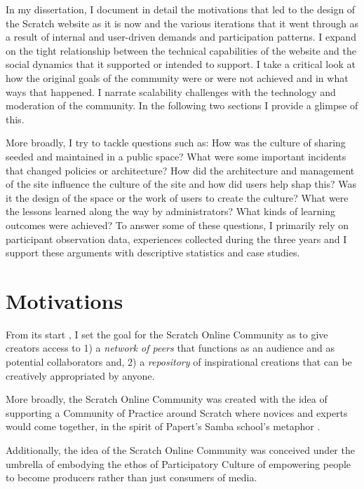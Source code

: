 In my dissertation, I  document in detail the motivations that led to the design of the Scratch website as it is now and the various iterations that it went through as a result of internal and user-driven demands and participation patterns.
I expand on the tight relationship between the technical capabilities of the website and the social dynamics that it supported or intended to support.
I take a critical look at how the original goals of the community were or were not achieved and in what ways that happened. 
I narrate scalability challenges with the technology and moderation of the community.
In the following two sections I provide a glimpse of this.

More broadly, I try to tackle questions such as: How was the culture of sharing seeded and maintained in a public space? What were some important incidents that changed policies or architecture? How did the architecture and management of the site influence the culture of the site and how did users help shap this? 
Was it the design of the space or the work of users to create the culture?
 What were the lessons learned along the way by administrators? What kinds of learning outcomes were achieved?
To answer some of these questions, I primarily rely on participant observation data, experiences collected during the three years and I support these arguments with descriptive statistics and case studies.


\section{Motivations}

From its start \citep{monroy-hernandez_scratchr:_2007,monroy-hernandez_empowering_2008}, I set the goal for the Scratch Online Community as to give creators access to 
1) a \emph{network of peers} that functions as an audience and as potential collaborators and,
2) a \emph{repository} of inspirational creations that can be creatively appropriated by anyone.

More broadly, the Scratch Online Community was created with the idea of supporting a Community of Practice around Scratch where novices and experts would come together,  in the spirit of Papert's Samba school's metaphor \citep{papert_mindstorms_1980}.

Additionally, the idea of the Scratch Online Community was conceived under the umbrella of embodying the ethos of Participatory Culture of empowering people to become producers rather than just consumers of media.

